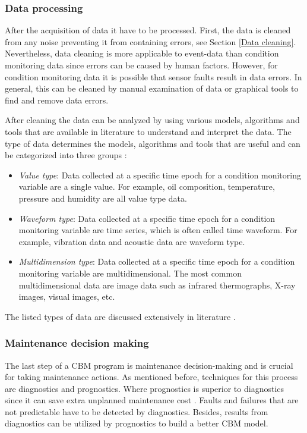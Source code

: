\subsubsection{Data processing}
After the acquisition of data it have to be processed. First, the data is cleaned from any noise preventing it from containing errors, see Section \ref{Data cleaning}. Nevertheless, data cleaning is more applicable to event-data than condition monitoring data since errors can be caused by human factors. However, for condition monitoring data it is possible that sensor faults result in data errors. In general, this can be cleaned by manual examination of data or graphical tools to find and remove data errors. 

After cleaning the data can be analyzed by using various models, algorithms and tools that are available in literature to understand and interpret the data. The type of data determines the models, algorithms and tools that are useful and can be categorized into three groups \parencite{JARDINE2006}:
\begin{itemize}
\item \textit{Value type}: Data collected at a specific time epoch for a condition monitoring variable are a single value. For example, oil composition, temperature, pressure and humidity are all value type data.
\item \textit{Waveform type}: Data collected at a specific time epoch for a condition monitoring variable are time series, which is often called time waveform. For example, vibration data and acoustic data are waveform type.
\item \textit{Multidimension type}: Data collected at a specific time epoch for a condition monitoring variable are multidimensional. The most common multidimensional data are image data such as infrared thermographs, X-ray images, visual images, etc.
\end{itemize}
The listed types of data are discussed extensively in literature \parencite{WANG1993,Heger2004,ELLWEIN2002}.

\subsubsection{Maintenance decision making}
The last step of a CBM program is maintenance decision-making and is crucial for taking maintenance actions. As mentioned before, techniques for this process are diagnostics and prognostics. Where prognostics is superior to diagnostics since it can save extra unplanned maintenance cost \parencite{JARDINE2006}. Faults and failures that are not predictable have to be detected by diagnostics. Besides, results from diagnostics can be utilized by prognostics to build a better CBM model. 

